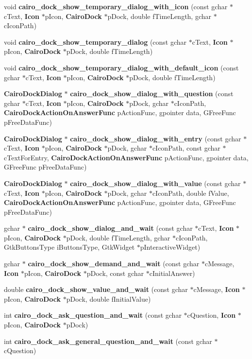 \begin{CompactItemize}
\item 
void {\bf cairo\_\-dock\_\-show\_\-temporary\_\-dialog\_\-with\_\-icon} (const gchar $\ast$c\-Text, {\bf Icon} $\ast$p\-Icon, {\bf Cairo\-Dock} $\ast$p\-Dock, double f\-Time\-Length, gchar $\ast$c\-Icon\-Path)
\item 
void {\bf cairo\_\-dock\_\-show\_\-temporary\_\-dialog} (const gchar $\ast$c\-Text, {\bf Icon} $\ast$p\-Icon, {\bf Cairo\-Dock} $\ast$p\-Dock, double f\-Time\-Length)
\item 
void {\bf cairo\_\-dock\_\-show\_\-temporary\_\-dialog\_\-with\_\-default\_\-icon} (const gchar $\ast$c\-Text, {\bf Icon} $\ast$p\-Icon, {\bf Cairo\-Dock} $\ast$p\-Dock, double f\-Time\-Length)
\item 
{\bf Cairo\-Dock\-Dialog} $\ast$ {\bf cairo\_\-dock\_\-show\_\-dialog\_\-with\_\-question} (const gchar $\ast$c\-Text, {\bf Icon} $\ast$p\-Icon, {\bf Cairo\-Dock} $\ast$p\-Dock, gchar $\ast$c\-Icon\-Path, {\bf Cairo\-Dock\-Action\-On\-Answer\-Func} p\-Action\-Func, gpointer data, GFree\-Func p\-Free\-Data\-Func)
\item 
{\bf Cairo\-Dock\-Dialog} $\ast$ {\bf cairo\_\-dock\_\-show\_\-dialog\_\-with\_\-entry} (const gchar $\ast$c\-Text, {\bf Icon} $\ast$p\-Icon, {\bf Cairo\-Dock} $\ast$p\-Dock, gchar $\ast$c\-Icon\-Path, const gchar $\ast$c\-Text\-For\-Entry, {\bf Cairo\-Dock\-Action\-On\-Answer\-Func} p\-Action\-Func, gpointer data, GFree\-Func p\-Free\-Data\-Func)
\item 
{\bf Cairo\-Dock\-Dialog} $\ast$ {\bf cairo\_\-dock\_\-show\_\-dialog\_\-with\_\-value} (const gchar $\ast$c\-Text, {\bf Icon} $\ast$p\-Icon, {\bf Cairo\-Dock} $\ast$p\-Dock, gchar $\ast$c\-Icon\-Path, double f\-Value, {\bf Cairo\-Dock\-Action\-On\-Answer\-Func} p\-Action\-Func, gpointer data, GFree\-Func p\-Free\-Data\-Func)
\item 
gchar $\ast$ {\bf cairo\_\-dock\_\-show\_\-dialog\_\-and\_\-wait} (const gchar $\ast$c\-Text, {\bf Icon} $\ast$p\-Icon, {\bf Cairo\-Dock} $\ast$p\-Dock, double f\-Time\-Length, gchar $\ast$c\-Icon\-Path, Gtk\-Buttons\-Type i\-Buttons\-Type, Gtk\-Widget $\ast$p\-Interactive\-Widget)
\item 
gchar $\ast$ {\bf cairo\_\-dock\_\-show\_\-demand\_\-and\_\-wait} (const gchar $\ast$c\-Message, {\bf Icon} $\ast$p\-Icon, {\bf Cairo\-Dock} $\ast$p\-Dock, const gchar $\ast$c\-Initial\-Answer)
\item 
double {\bf cairo\_\-dock\_\-show\_\-value\_\-and\_\-wait} (const gchar $\ast$c\-Message, {\bf Icon} $\ast$p\-Icon, {\bf Cairo\-Dock} $\ast$p\-Dock, double f\-Initial\-Value)
\item 
int {\bf cairo\_\-dock\_\-ask\_\-question\_\-and\_\-wait} (const gchar $\ast$c\-Question, {\bf Icon} $\ast$p\-Icon, {\bf Cairo\-Dock} $\ast$p\-Dock)
\item 
int {\bf cairo\_\-dock\_\-ask\_\-general\_\-question\_\-and\_\-wait} (const gchar $\ast$c\-Question)
\end{CompactItemize}
